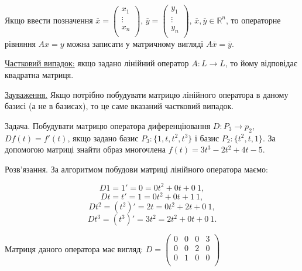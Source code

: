 Якщо ввести позначення $\overline{x} = \begin{pmatrix} x_1 \\  \vdots \\  x_n \\  \end{pmatrix}$,
$\overline{y} = \begin{pmatrix} y_1 \\  \vdots \\  y_n \\  \end{pmatrix}$,
$\overline{x}, \overline{y} \in \mathbb{R}^n$, то операторне
рівняння $A x = y$ можна записати у матричному вигляді $A \overline{x} = \overline{y}$.

\underline{Частковий випадок:} якщо задано лінійний оператор $A: L \rightarrow L$, то йому
відповідає квадратна матриця.

\underline{Зауваження.} Якщо потрібно побудувати матрицю лінійного оператора в
даному базисі (а не в базисах), то це саме вказаний частковий випадок.


Задача. Побудувати матрицю оператора диференціювання
$D: P_3 \rightarrow p_2$, $D f(t) = f'(t)$, якщо задано базис $P_3: \{1, t, t^2, t^3\}$
і базис $P_2: \{t^2, t, 1\}$.
За допомогою матриці знайти образ многочлена $f(t) = 3t^3 - 2t^2 + 4t -5$.


Розв’язання. За алгоритмом побудови матриці лінійного оператора маємо:

$$D1 = 1' = 0 = 0t^2 + 0t + 0~1,$$
$$Dt = t' = 1 = 0 t^2 + 0t + 1~1,$$
$$Dt^2 = (t^2)' = 2t = 0t^2 + 2t + 0~1,$$
$$Dt^3 = (t^3)' = 3t^2 = 2t^2 + 0t + 0~1.$$

Матриця даного оператора має вигляд:
$D = \begin{pmatrix}
	0 & 0 & 0 & 3 \\
	0 & 0 & 2 & 0 \\
	0 & 1 & 0 & 0 \\
\end{pmatrix}$

